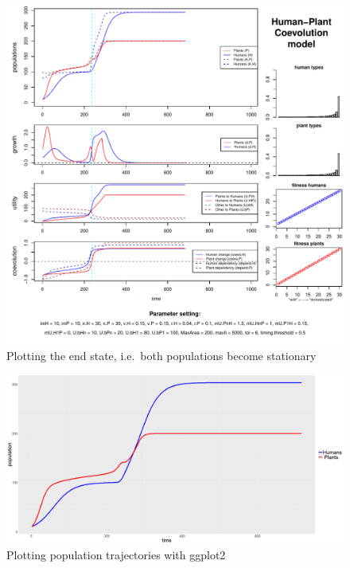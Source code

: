 \documentclass[]{book}
\begin{document}
\begin{figure}
\centering
\includegraphics{hpcModel-exploration_files/figure-latex/1runcoevocoetaplot-1.pdf}
\caption{\label{fig:1runcoevocoetaplot}Plotting the end state, i.e.~both populations become stationary}
\end{figure}

\newpage

\begin{figure}
\includegraphics[width=1\linewidth]{plots/1_singleRun-ggplot-coevo.coeta} \caption{Plotting population trajectories with ggplot2}\label{fig:1runcoevocoetaggplotprint}
\end{figure}

\newpage
\end{document}
